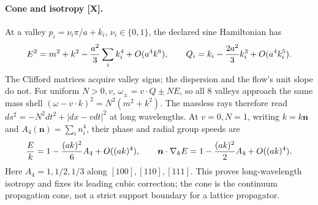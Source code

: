 
\paragraph{Cone and isotropy [X].}
At a valley $p_i=\nu_i\pi/a+k_i$, $\nu_i\in\{0,1\}$, the declared
sine Hamiltonian has
\[
 E^2=m^2+k^2-{a^2\over3}\sum_i k_i^4+O(a^4k^6),\qquad
 Q_i=k_i-{2a^2\over3}k_i^3+O(a^4k_i^5).
\]
The Clifford matrices acquire valley signs; the dispersion and the flow's
unit slope do not.  For uniform $N>0,v$,
$\omega_\pm=v\cdot Q\pm NE$, so all 8 valleys approach the same
mass shell $(\omega-v\cdot k)^2=N^2(m^2+k^2)$.
The massless rays therefore read
$ds^2=-N^2dt^2+|dx-vdt|^2$ at long wavelengths.
At $v=0,N=1$, writing $k=k\boldsymbol n$ and
$A_4(\boldsymbol n)=\sum_i n_i^4$, their phase and radial group speeds are
\[
 {E\over k}=1-{(ak)^2\over6}A_4+O((ak)^4),\qquad
 \boldsymbol n\cdot\nabla_k E
 =1-{(ak)^2\over2}A_4+O((ak)^4).
\]
Here $A_4=1,1/2,1/3$ along $[100],[110],[111]$.
This proves long-wavelength isotropy and fixes its leading cubic correction;
the cone is the continuum propagation cone, not a strict support boundary
for a lattice propagator.
